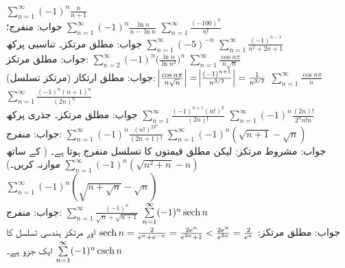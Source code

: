 $\sum\limits_{n=1}^{\infty}(-1)^n\frac{n}{n+1}$\\
جواب:\quad
منفرج؛ 
$\sum\limits_{n=1}^{\infty}(-1)^n\frac{\ln n}{n-\ln n}$
$\sum\limits_{n=1}^{\infty}\frac{(-100)^n}{n!}$\\
جواب:\quad
مطلق مرتکز۔ تناسبی پرکھ
$\sum\limits_{n=1}^{\infty}(-5)^{-n}$
$\sum\limits_{n=1}^{\infty}\frac{(-1)^{n-1}}{n^2+2n+1}$\\
جواب:\quad
مطلق مرتکز: 
$\sum\limits_{n=2}^{\infty}(-1)^n\big(\frac{\ln n}{\ln n^2}\big)^n$
$\sum\limits_{n=1}^{\infty}\frac{\cos n\pi}{n\sqrt{n}}$\\
جواب:\quad
مطلق ارتکاز (مرتکز  تسلسل):  
$\abs{\tfrac{\cos n\pi}{n\sqrt{n}}}=\abs{\tfrac{(-1)^{n+1}}{n^{3/2}}}=\tfrac{1}{n^{3/2}}$
$\sum\limits_{n=1}^{\infty}\frac{\cos n\pi}{n}$
$\sum\limits_{n=1}^{\infty}\frac{(-1)^n(n+1)^n}{(2n)^n}$\\
جواب:\quad
مطلق مرتکز۔ جذری پرکھ
$\sum\limits_{n=1}^{\infty}\frac{(-1)^{n+1}(n!)^2}{(2n)!}$
$\sum\limits_{n=1}^{\infty}(-1)^n\frac{(2n)!}{2^nn!n}$\\
جواب:\quad
منفرج: 
$\sum\limits_{n=1}^{\infty}(-1)^n\frac{(n!)^23^n}{(2n+1)!}$
$\sum\limits_{n=1}^{\infty}(-1)^n(\sqrt{n+1}-\sqrt{n})$\\
جواب:\quad
مشروط مرتکز:  لیکن مطلق قیمتوں کا تسلسل منفرج ہوتا ہے۔ ( کے ساتھ موازنہ کریں۔) 
$\sum\limits_{n=1}^{\infty}(-1)^n(\sqrt{n^2+n}-n)$
$\sum\limits_{n=1}^{\infty}(-1)^n(\sqrt{n+\sqrt{n}}-\sqrt{n})$\\
جواب:\quad
منفرج: 
$\sum\limits_{n=1}^{\infty}\frac{(-1)^n}{\sqrt{n}+\sqrt{n+1}}$
$\sum\limits_{n=1}^{\infty}(-1)^n\operatorname{sech} n$\\
جواب:\quad
مطلق مرتکز: 
$\operatorname{sech} n=\tfrac{2}{e^n+e^{-n}}=\tfrac{2e^n}{e^{2n}+1}<\tfrac{2e^n}{e^{2n}}=\tfrac{2}{e^n}$ 
اور  مرتکز ہندسی تسلسل کا ایک جزو ہے۔
$\sum\limits_{n=1}^{\infty}(-1)^n\operatorname{csch} n$

